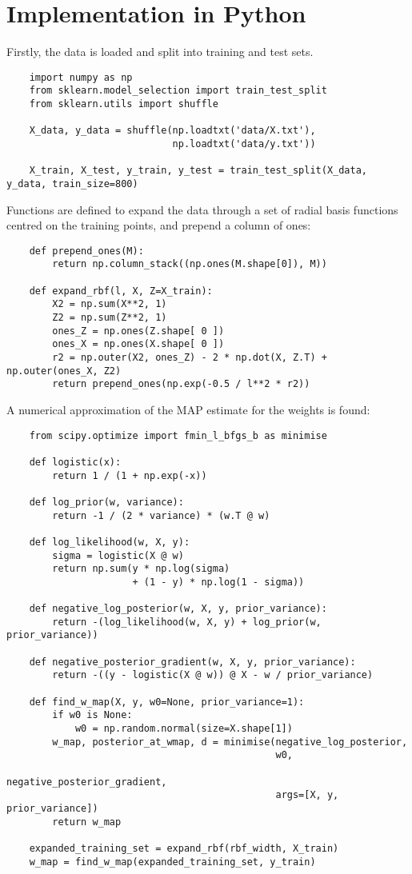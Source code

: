 \documentclass[a4paper]{article}
\begin{document}
    \section{Implementation in Python}
    Firstly, the data is loaded and split into training and test sets.
    \begin{verbatim}
    import numpy as np
    from sklearn.model_selection import train_test_split
    from sklearn.utils import shuffle

    X_data, y_data = shuffle(np.loadtxt('data/X.txt'),
                             np.loadtxt('data/y.txt'))

    X_train, X_test, y_train, y_test = train_test_split(X_data, y_data, train_size=800)
    \end{verbatim}
    Functions are defined to expand the data through a set of radial basis functions centred on the training points, and prepend a column of ones:
    \begin{verbatim}
    def prepend_ones(M):
        return np.column_stack((np.ones(M.shape[0]), M))

    def expand_rbf(l, X, Z=X_train):
        X2 = np.sum(X**2, 1)
        Z2 = np.sum(Z**2, 1)
        ones_Z = np.ones(Z.shape[ 0 ])
        ones_X = np.ones(X.shape[ 0 ])
        r2 = np.outer(X2, ones_Z) - 2 * np.dot(X, Z.T) + np.outer(ones_X, Z2)
        return prepend_ones(np.exp(-0.5 / l**2 * r2))
    \end{verbatim}
    A numerical approximation of the MAP estimate for the weights is found:
    \begin{verbatim}
    from scipy.optimize import fmin_l_bfgs_b as minimise

    def logistic(x):
        return 1 / (1 + np.exp(-x))

    def log_prior(w, variance):
        return -1 / (2 * variance) * (w.T @ w)

    def log_likelihood(w, X, y):
        sigma = logistic(X @ w)
        return np.sum(y * np.log(sigma)
                      + (1 - y) * np.log(1 - sigma))

    def negative_log_posterior(w, X, y, prior_variance):
        return -(log_likelihood(w, X, y) + log_prior(w, prior_variance))

    def negative_posterior_gradient(w, X, y, prior_variance):
        return -((y - logistic(X @ w)) @ X - w / prior_variance)

    def find_w_map(X, y, w0=None, prior_variance=1):
        if w0 is None:
            w0 = np.random.normal(size=X.shape[1])
        w_map, posterior_at_wmap, d = minimise(negative_log_posterior,
                                               w0,
                                               negative_posterior_gradient,
                                               args=[X, y, prior_variance])
        return w_map

    expanded_training_set = expand_rbf(rbf_width, X_train)
    w_map = find_w_map(expanded_training_set, y_train)
    \end{verbatim}
\end{document}
